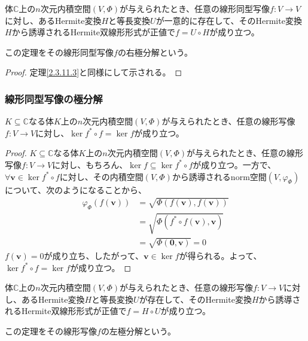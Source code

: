 \documentclass[dvipdfmx]{jsarticle}
\begin{document}
\begin{thm}[右極分解]\label{2.3.11.4}
体$\mathbb{C}$上の$n$次元内積空間$(V,\varPhi)$が与えられたとき、任意の線形同型写像$f:V \rightarrow V$に対し、あるHermite変換$H$と等長変換$U$が一意的に存在して、そのHermite変換$H$から誘導されるHermite双線形形式が正値で$f = U \circ H$が成り立つ。\par
この定理をその線形同型写像$f$の右極分解という。
\end{thm}
\begin{proof}定理\ref{2.3.11.3}と同様にして示される。
\end{proof}
\subsubsection{線形同型写像の極分解}%
\begin{thm}\label{2.3.11.5}
$K \subseteq \mathbb{C}$なる体$K$上の$n$次元内積空間$(V,\varPhi)$が与えられたとき、任意の線形写像$f:V \rightarrow V$に対し、$\ker{f^{*} \circ f} = \ker f$が成り立つ。
\end{thm}
\begin{proof}
$K \subseteq \mathbb{C}$なる体$K$上の$n$次元内積空間$(V,\varPhi)$が与えられたとき、任意の線形写像$f:V \rightarrow V$に対し、もちろん、$\ker f \subseteq \ker{f^{*} \circ f}$が成り立つ。一方で、$\forall\mathbf{v} \in \ker{f^{*} \circ f}$に対し、その内積空間$(V,\varPhi)$から誘導されるnorm空間$\left( V,\varphi_{\varPhi} \right)$について、次のようになることから、
\begin{align*}
\varphi_{\varPhi}\left( f\left( \mathbf{v} \right) \right) &= \sqrt{\varPhi\left( f\left( \mathbf{v} \right),f\left( \mathbf{v} \right) \right)}\\
&= \sqrt{\varPhi\left( f^{*} \circ f\left( \mathbf{v} \right),\mathbf{v} \right)}\\
&= \sqrt{\varPhi\left( \mathbf{0},\mathbf{v} \right)} = 0
\end{align*}
$f\left( \mathbf{v} \right) = 0$が成り立ち、したがって、$\mathbf{v} \in \ker f$が得られる。よって、$\ker{f^{*} \circ f} = \ker f$が成り立つ。
\end{proof}
\begin{thm}[左極分解]\label{2.3.11.6}
体$\mathbb{C}$上の$n$次元内積空間$(V,\varPhi)$が与えられたとき、任意の線形写像$f:V \rightarrow V$に対し、あるHermite変換$H$と等長変換$U$が存在して、そのHermite変換$H$から誘導されるHermite双線形形式が正値で$f = H \circ U$が成り立つ。\par
この定理をその線形写像$f$の左極分解という。
\end{thm}
\end{document}
